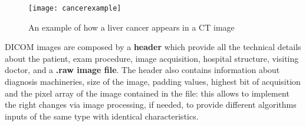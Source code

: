 \documentclass[../main.tex]{subfiles}
\begin{document}
\begin{figure}[H] 
\centering 
\texttt{[image: cancerexample]}
\caption{An example of how a liver cancer appears in a CT image \cite{Liver}}
\label{cancerexample} 
\vspace{5mm}
\end{figure}

DICOM images are composed by a \textbf{header} which provide all the technical details about the patient, exam procedure, image acquisition, hospital structure, visiting doctor, and a \textbf{.raw image file}. The header also contains information about diagnosis machineries, size of the image, padding values, highest bit of acquisition and the pixel array of the image contained in the file: this allows to implement the right changes via image processing, if needed, to provide different algorithms inputs of the same type with identical characteristics.
\vspace{5mm}
\end{document}
